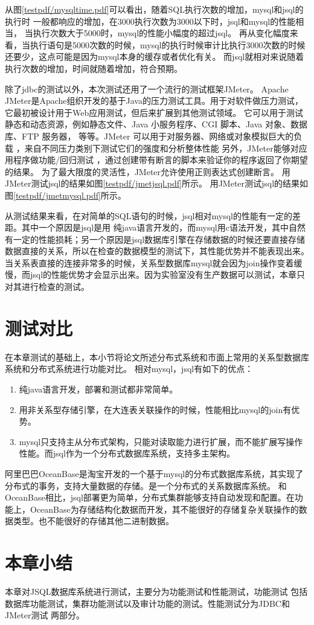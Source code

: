 

从图\ref{testpdf/mysqltime.pdf}可以看出，随着SQL执行次数的增加，mysql和jsql的执行时
一般都响应的增加，在3000执行次数为3000以下时，jsql和mysql的性能相当，
当执行次数大于5000时，mysql的性能小幅度的超过jsql。
再从变化幅度来看，当执行语句是5000次数的时候，mysql的执行时候审计比执行3000次数的时候
还要少，这点可能是因为mysql本身的缓存或者优化有关。
而jsql就相对来说随着执行次数的增加，时间就随着增加，符合预期。

除了jdbc的测试以外，本次测试还用了一个流行的测试框架JMeter。
Apache JMeter是Apache组织开发的基于Java的压力测试工具。用于对软件做压力测试，
它最初被设计用于Web应用测试，但后来扩展到其他测试领域。
 它可以用于测试静态和动态资源，例如静态文件、Java
  小服务程序、CGI 脚本、Java 对象、数据库、FTP 服务器，
   等等。JMeter 可以用于对服务器、网络或对象模拟巨大的负载
   ，来自不同压力类别下测试它们的强度和分析整体性能
   另外，JMeter能够对应用程序做功能/回归测试
   ，通过创建带有断言的脚本来验证你的程序返回了你期望的结果。
   为了最大限度的灵活性，JMeter允许使用正则表达式创建断言。
   用JMeter测试jsql的结果如图\ref{testpdf/jmetjsql.pdf}所示。
    用JMeter测试jsql的结果如图\ref{testpdf/jmetmysql.pdf}所示。
   
   从测试结果来看，在对简单的SQL语句的时候，jsql相对mysql的性能有一定的差距。其中一个原因是jsql是用
   纯java语言开发的，而mysql用c语法开发，其中自然有一定的性能损耗；另一个原因是jsql数据库引擎在存储数据的时候还要直接存储数据直接的关系，所以在检查的数据模型的测试下，其性能优势并不能表现出来。当关系表直接的连接非常多的时候，关系型数据库mysql就会因为join操作变着缓慢，而jsql的性能优势才会显示出来。因为实验室没有生产数据可以测试，本章只对其进行检查的测试。
\section{测试对比}
在本章测试的基础上，本小节将论文所述分布式系统和市面上常用的关系型数据库系统和分布式系统进行功能对比。
相对mysql，jsql有如下的优点：
\begin{enumerate}
	\item 纯java语言开发，部署和测试都非常简单。
	\item 用非关系型存储引擎，在大连表关联操作的时候，性能相比mysql的join有优势。
	\item mysql只支持主从分布式架构，只能对读取能力进行扩展，而不能扩展写操作性能。而jsql作为一个分布式数据库系统，支持多主架构。
\end{enumerate}

阿里巴巴OceanBase是淘宝开发的一个基于mysql的分布式数据库系统，其实现了分布式的事务，支持大量数据的存储。是一个分布式的关系数据库系统。
和OceanBase相比，jsql部署更为简单，分布式集群能够支持自动发现和配置。在功能上，OceanBase为存储结构化数据而开发，其不能很好的存储复杂关联操作的数据类型。也不能很好的存储其他二进制数据。
\section{本章小结}
本章对JSQL数据库系统进行测试，主要分为功能测试和性能测试，功能测试
包括数据库功能测试，集群功能测试以及审计功能的测试。性能测试分为JDBC和JMeter测试
两部分。